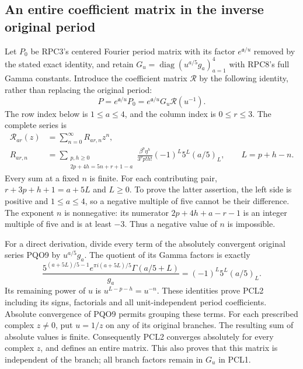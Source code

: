 \documentclass[11pt,a4paper]{article}
\begin{document}
\subsection{An entire coefficient matrix in the inverse original period}
Let $P_0$ be RPC3's centered Fourier period matrix with its factor
$e^{\mathfrak a/u}$ removed by the stated exact identity, and retain
$G_u=\operatorname{diag}(u^{a/5}g_a)_{a=1}^4$ with RPC8's full
Gamma constants. Introduce the coefficient matrix $\mathcal R$ by
the following identity, rather than replacing the original period:
\[
 P= e^{\mathfrak a/u}P_0
   = e^{\mathfrak a/u}G_u\mathcal R(u^{-1}).
 \tag{PCL1}
\]
The row index below is $1\le a\le4$, and the column index is
$0\le r\le3$. The complete series is
\[
 \begin{split}
 \mathcal R_{a r}(z)&=\sum_{n=0}^{\infty}R_{a r,n}z^n,\\
 R_{a r,n}&=
 \sum_{\substack{p,h\ge0\\2p+4h=5n+r+1-a}}
 \frac{\beta^p\eta^h}{3^p p!h!}
      (-1)^{L}5^L(a/5)_L,
 \qquad L=p+h-n.
 \end{split}\tag{PCL2}
\]
Every sum at a fixed $n$ is finite. For each contributing pair,
$r+3p+h+1=a+5L$ and $L\ge0$. To prove the latter assertion,
the left side is positive and $1\le a\le4$, so a negative multiple
of five cannot be their difference. The exponent $n$ is nonnegative:
its numerator $2p+4h+a-r-1$ is an integer multiple of five and is
at least $-3$. Thus a negative value of $n$ is impossible.

For a direct derivation, divide every term of the absolutely
convergent original series PQO9 by $u^{a/5}g_a$. The quotient of
its Gamma factors is exactly
\[
 \frac{5^{(a+5L)/5-1}e^{\pi i(a+5L)/5}
                  \Gamma(a/5+L)}{g_a}
        =(-1)^L5^L(a/5)_L.
 \tag{PCL3}
\]
Its remaining power of $u$ is $u^{L-p-h}=u^{-n}$.
These identities prove PCL2 including its signs, factorials and
all unit-independent period coefficients. Absolute convergence of
PQO9 permits grouping these terms. For each prescribed complex
$z\ne0$, put $u=1/z$ on any of its original branches. The resulting
sum of absolute values is finite. Consequently PCL2 converges
absolutely for every complex $z$, and defines an entire matrix.
This also proves that this matrix is independent of the branch;
all branch factors remain in $G_u$ in PCL1.
\end{document}
